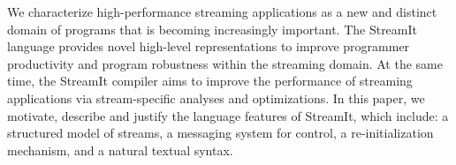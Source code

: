 We characterize high-performance streaming applications as a new and
distinct domain of programs that is becoming increasingly important.
The StreamIt language provides novel high-level representations to
improve programmer productivity and program robustness within the
streaming domain.  At the same time, the StreamIt compiler aims to
improve the performance of streaming applications via stream-specific
analyses and optimizations.  In this paper, we motivate, describe and
justify the language features of StreamIt, which include: a structured
model of streams, a messaging system for control, a re-initialization
mechanism, and a natural textual syntax.


